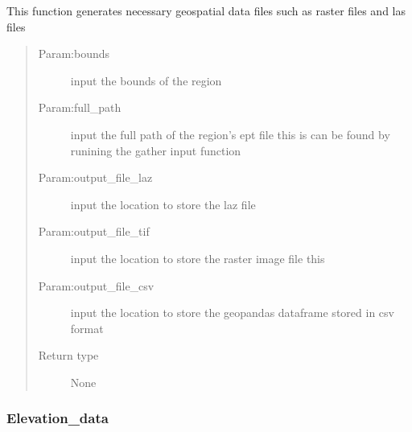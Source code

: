 \documentclass[letterpaper,10pt,english]{sphinxmanual}
\begin{document}

\begin{fulllineitems}
\label{\detokenize{tutorial:get_raster_terrain}}
\sphinxAtStartPar
This function generates necessary geospatial data files such as raster files and las files
\begin{quote}\begin{description}
\item[{Param:bounds}] \leavevmode
\sphinxAtStartPar
input the bounds of the region

\item[{Param:full\_path}] \leavevmode
\sphinxAtStartPar
input the full path of the region’s ept file this is can be found by runining the gather input function

\item[{Param:output\_file\_laz}] \leavevmode
\sphinxAtStartPar
input the location to store the laz file

\item[{Param:output\_file\_tif}] \leavevmode
\sphinxAtStartPar
input the location to store the raster image file this

\item[{Param:output\_file\_csv}] \leavevmode
\sphinxAtStartPar
input the location to store the geopandas dataframe stored in csv format

\item[{Return type}] \leavevmode
\sphinxAtStartPar
None

\end{description}\end{quote}

\end{fulllineitems}



\subsubsection{Elevation\_data}
\label{\detokenize{tutorial:elevation-data}}
\end{document}
